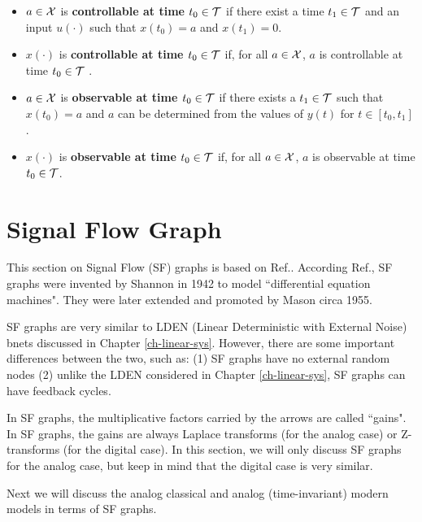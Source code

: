  \begin{itemize}
 \item
$a\in{\cal X}$ is {\bf controllable
at time $t_0\in{\cal T}$
}
if there exist a time
$t_1\in{\cal T}$ and an input $u(\cdot)$ such that $x(t_0)=a$
and $x(t_1)=0$.
\item
$x(\cdot)$ is {\bf controllable 
at time $t_0\in{\cal T}$}
if, for all $a\in{\cal X}$, 
 $a$ is controllable 
at time $t_0\in{\cal T}$ .
\item
$a\in{\cal X}$ is {\bf observable at time $t_0\in{\cal T}$}
if there exists a $t_1\in {\cal T}$
such that 
$x(t_0)=a$
and $a$
can be determined from
the values of 
$y(t)$ for $t\in [t_0, t_1]$.
\item
$x(\cdot)$ is {\bf observable
at time $t_0\in{\cal T}$ } 
if,
for all $a\in {\cal X}$, $a$ is 
observable 
at time $t_0\in{\cal T}$.
\end{itemize}

\section{Signal Flow Graph}
This section on
Signal Flow (SF) 
graphs
is based on Ref.\cite{wiki-signal-flow}.
According Ref.\cite{wiki-signal-flow},
SF graphs were invented by Shannon
in 1942
to model ``differential equation machines". 
They were later 
extended and promoted by Mason circa 1955.

SF graphs are 
very similar to
LDEN (Linear Deterministic
with External Noise) bnets discussed in
Chapter \ref{ch-linear-sys}. However, 
there are some important differences between
the two, such as: (1) SF graphs
have no external random nodes
(2)
unlike the LDEN considered in 
Chapter \ref{ch-linear-sys},
SF graphs can have feedback cycles.

In SF graphs, the
multiplicative factors
carried by the arrows  are called 
``gains". In SF graphs,
the gains are always 
Laplace transforms (for the analog case)
or Z-transforms (for the digital case).
In this section, 
we will only discuss SF graphs for the
analog case, but keep in mind that the digital
case is very similar.

Next we will discuss the
analog classical and analog (time-invariant) modern
models in terms of SF graphs.

